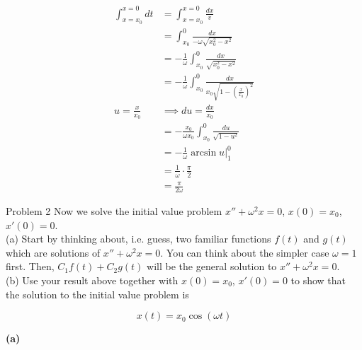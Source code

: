\documentclass{article}
\begin{document}
    \begin{align*}
        \int_{x=x_0}^{x=0}dt    &= \int_{x=x_0}^{x=0} \frac{dx}{v} \\
                                &= \int_{x_0}^{0} \frac{dx}{-\omega\sqrt{x_0^2 - x^2}} \\
                                &= -\frac{1}{\omega}\int_{x_0}^0 \frac{dx}{\sqrt{x_0^2-x^2}} \\
                                &= -\frac{1}{\omega}\int_{x_0}^0 \frac{dx}{x_0\sqrt{1-\left(\frac{x}{x_0}\right)^2}} \\
        u = \frac{x}{x_0}       &\implies du = \frac{dx}{x_0} \\
                                &= -\frac{x_0}{\omega x_0} \int_{x_0}^0 \frac{du}{\sqrt{1-u^2}} \\
                                &= -\frac{1}{\omega}\arcsin{u}\Big|_1^0 \\
                                &= \frac{1}{\omega} \cdot \frac{\pi}{2} \\
                                &= \frac{\pi}{2\omega}
    \end{align*}




    \begin{tbhtheorem}{Problem 2}
        Now we solve the initial value problem $x'' + {\omega}^2 x = 0$, $x(0) = x_0$, $x'(0) = 0$. \\
        (a) Start by thinking about, i.e. guess, two familiar functions $f(t)$ and $g(t)$ which are solutions of $x'' + {\omega}^2 x = 0$. You can think about the simpler case $\omega = 1$ first. Then,
        $C_1 f(t) + C_2 g(t)$ will be the general solution to $x'' + {\omega}^2 x = 0$. \\
        (b) Use your result above together with $x(0) = x_0$, $x'(0) = 0$ to show that the solution to the initial value problem is

        \[
            x(t) = x_0 \cos{\left(\omega t\right)}
        \]
    \end{tbhtheorem}

    \textbf{(a)}









    \pagebreak
\end{document}
